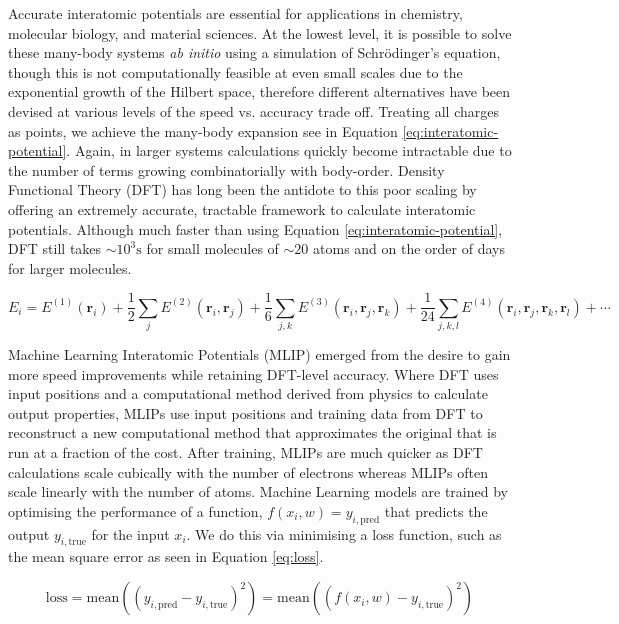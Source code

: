 Accurate interatomic potentials are essential for applications in chemistry, molecular biology, and material sciences. At the lowest level, it is possible to solve these many-body systems \textit{ab initio} using a simulation of Schr\"odinger's equation, though this is not computationally feasible at even small scales due to the exponential growth of the Hilbert space, therefore different alternatives have been devised at various levels of the speed vs. accuracy trade off. Treating all charges as points, we achieve the many-body expansion see in Equation \ref{eq:interatomic-potential}. Again, in larger systems calculations quickly become intractable due to the number of terms growing combinatorially with body-order. Density Functional Theory (DFT) \cite{hohenberg1964inhomogeneous, kohn1965self} has long been the antidote to this poor scaling by offering an extremely accurate, tractable framework to calculate interatomic potentials. Although much faster than using Equation \ref{eq:interatomic-potential}, DFT still takes $\sim10^3\mathrm s$ for small molecules of $\sim 20$ atoms and on the order of days for larger molecules.


\begin{equation} \label{eq:interatomic-potential}
    E_i = E^{(1)}(\mathbf r_i) + \frac 1 {2}\sum_{j}E^{(2)}(\mathbf r_i, \mathbf r_j) + \frac 1 {6}\sum_{j,k}E^{(3)}(\mathbf r_i, \mathbf r_j, \mathbf r_k) + \frac 1 {24}\sum_{j,k,l}E^{(4)}(\mathbf r_i, \mathbf r_j, \mathbf r_k, \mathbf r_l) + \cdots
\end{equation}

Machine Learning Interatomic Potentials (MLIP) emerged from the desire to gain more speed improvements while retaining DFT-level accuracy. Where DFT uses input positions and a computational method derived from physics to calculate output properties, MLIPs use input positions and training data from DFT to reconstruct a new computational method that approximates the original that is run at a fraction of the cost. After training, MLIPs are  much quicker as DFT calculations scale cubically with the number of electrons whereas MLIPs often scale linearly with the number of atoms. Machine Learning models are trained by optimising the performance of a function, $f(x_i, w) = y_{i,\text{pred}}$ that predicts the output $y_{i,\text{true}}$ for the input $x_i$. We do this via minimising a loss function, such as the mean square error as seen in Equation \ref{eq:loss}. 

\begin{equation} \label{eq:loss}
    \mathrm{loss} = \mathrm{mean}((y_{i,\text{pred}} - y_{i,\text{true}})^2) = \mathrm{mean}((f(x_i,w) - y_{i,\text{true}})^2)
\end{equation}

